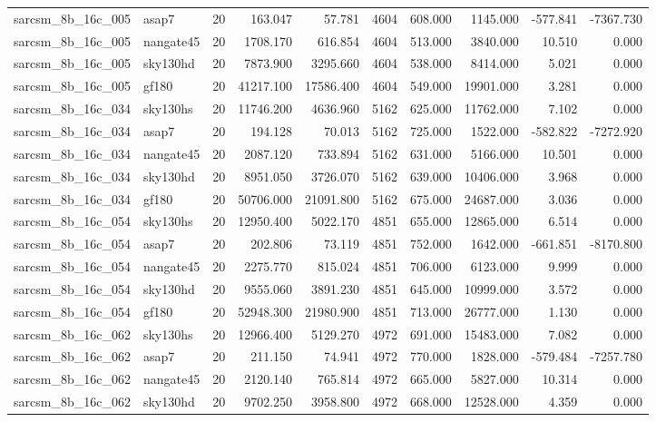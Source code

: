 \begin{longtable}{llrrrrrrrr}
sarcsm\_8b\_16c\_005 & asap7 & 20 & 163.047 & 57.781 & 4604 & 608.000 & 1145.000 & -577.841 & -7367.730 \\
sarcsm\_8b\_16c\_005 & nangate45 & 20 & 1708.170 & 616.854 & 4604 & 513.000 & 3840.000 & 10.510 & 0.000 \\
sarcsm\_8b\_16c\_005 & sky130hd & 20 & 7873.900 & 3295.660 & 4604 & 538.000 & 8414.000 & 5.021 & 0.000 \\
sarcsm\_8b\_16c\_005 & gf180 & 20 & 41217.100 & 17586.400 & 4604 & 549.000 & 19901.000 & 3.281 & 0.000 \\
sarcsm\_8b\_16c\_034 & sky130hs & 20 & 11746.200 & 4636.960 & 5162 & 625.000 & 11762.000 & 7.102 & 0.000 \\
sarcsm\_8b\_16c\_034 & asap7 & 20 & 194.128 & 70.013 & 5162 & 725.000 & 1522.000 & -582.822 & -7272.920 \\
sarcsm\_8b\_16c\_034 & nangate45 & 20 & 2087.120 & 733.894 & 5162 & 631.000 & 5166.000 & 10.501 & 0.000 \\
sarcsm\_8b\_16c\_034 & sky130hd & 20 & 8951.050 & 3726.070 & 5162 & 639.000 & 10406.000 & 3.968 & 0.000 \\
sarcsm\_8b\_16c\_034 & gf180 & 20 & 50706.000 & 21091.800 & 5162 & 675.000 & 24687.000 & 3.036 & 0.000 \\
sarcsm\_8b\_16c\_054 & sky130hs & 20 & 12950.400 & 5022.170 & 4851 & 655.000 & 12865.000 & 6.514 & 0.000 \\
sarcsm\_8b\_16c\_054 & asap7 & 20 & 202.806 & 73.119 & 4851 & 752.000 & 1642.000 & -661.851 & -8170.800 \\
sarcsm\_8b\_16c\_054 & nangate45 & 20 & 2275.770 & 815.024 & 4851 & 706.000 & 6123.000 & 9.999 & 0.000 \\
sarcsm\_8b\_16c\_054 & sky130hd & 20 & 9555.060 & 3891.230 & 4851 & 645.000 & 10999.000 & 3.572 & 0.000 \\
sarcsm\_8b\_16c\_054 & gf180 & 20 & 52948.300 & 21980.900 & 4851 & 713.000 & 26777.000 & 1.130 & 0.000 \\
sarcsm\_8b\_16c\_062 & sky130hs & 20 & 12966.400 & 5129.270 & 4972 & 691.000 & 15483.000 & 7.082 & 0.000 \\
sarcsm\_8b\_16c\_062 & asap7 & 20 & 211.150 & 74.941 & 4972 & 770.000 & 1828.000 & -579.484 & -7257.780 \\
sarcsm\_8b\_16c\_062 & nangate45 & 20 & 2120.140 & 765.814 & 4972 & 665.000 & 5827.000 & 10.314 & 0.000 \\
sarcsm\_8b\_16c\_062 & sky130hd & 20 & 9702.250 & 3958.800 & 4972 & 668.000 & 12528.000 & 4.359 & 0.000 \\

\end{longtable}
